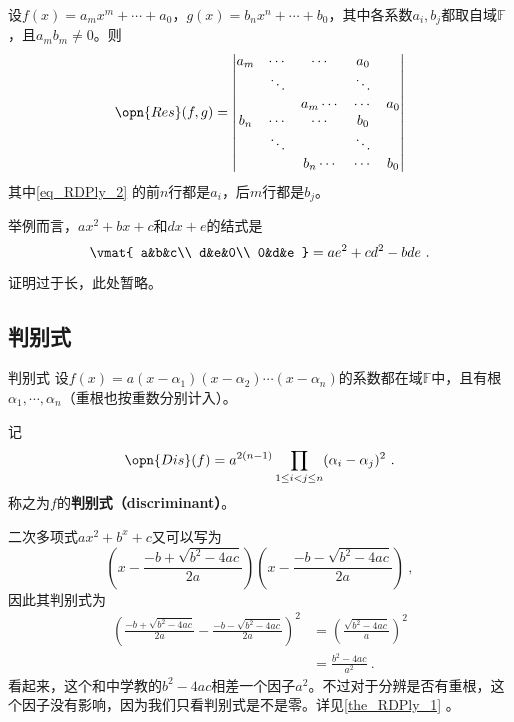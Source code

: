\begin{theorem}{}\label{the_RDPly_2}
设$f(x)=a_mx^m+\cdots+a_0$，$g(x)=b_nx^n+\cdots+b_0$，其中各系数$a_i, b_j$都取自域$\mathbb{F}$，且$a_mb_m\neq 0$。则
\begin{equation}\label{eq_RDPly_2}
\opn{Res}(f, g)=
\begin{vmatrix}
a_m&\cdots&\cdots&a_0\\
&\ddots& & \ddots\\
&&a_m\cdots&\cdots&a_0\\
b_n&\cdots&\cdots&b_0\\
&\ddots& & \ddots\\
&&b_n\cdots&\cdots&b_0\\
\end{vmatrix}
\end{equation}
其中\autoref{eq_RDPly_2} 的前$n$行都是$a_i$，后$m$行都是$b_j$。

举例而言，$ax^2+bx+c$和$dx+e$的结式是
\begin{equation}
\vmat{
    a&b&c\\
    d&e&0\\
    0&d&e
}
=
ae^2+cd^2-bde~.
\end{equation}

\end{theorem}

证明过于长，此处暂略。



\subsection{判别式}

\begin{definition}{判别式}\label{def_RDPly_1}
设$f(x)=a(x-\alpha_1)(x-\alpha_2)\cdots(x-\alpha_n)$的系数都在域$\mathbb{F}$中，且有根$\alpha_1, \cdots, \alpha_n$（重根也按重数分别计入）。

记
\begin{equation}\label{eq_RDPly_3}
\opn{Dis}(f) = a^{2(n-1)}\prod_{1\leq i<j\leq n}(\alpha_i-\alpha_j)^2~.
\end{equation}
称之为$f$的\textbf{判别式（discriminant）}。
\end{definition}

\begin{example}{}
二次多项式$ax^2+b^x+c$又可以写为
\begin{equation}
(x-\frac{-b+\sqrt{b^2-4ac}}{2a})(x-\frac{-b-\sqrt{b^2-4ac}}{2a})~,
\end{equation}
因此其判别式为
\begin{equation}
\begin{aligned}
(\frac{-b+\sqrt{b^2-4ac}}{2a}-\frac{-b-\sqrt{b^2-4ac}}{2a})^2 &= (\frac{\sqrt{b^2-4ac}}{a})^2\\
&=\frac{b^2-4ac}{a^2}~.
\end{aligned}
\end{equation}
看起来，这个和中学教的$b^2-4ac$相差一个因子$a^2$。不过对于分辨是否有重根，这个因子没有影响，因为我们只看判别式是不是零。详见\autoref{the_RDPly_1} 。
\end{example}


